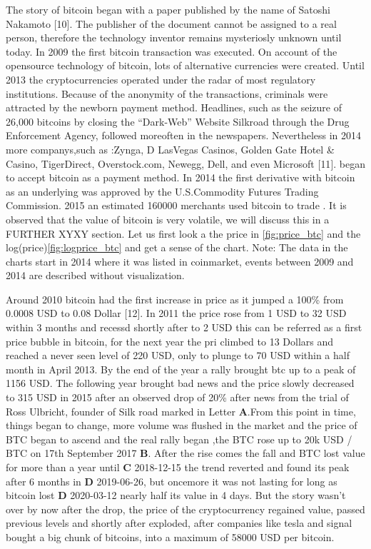 \documentclass[
]{article}
\begin{document}
The story of bitcoin began with a paper published by the name of Satoshi
Nakamoto {[}10{]}. The publisher of the document cannot be assigned to a
real person, therefore the technology inventor remains mysteriosly
unknown until today. In 2009 the first bitcoin transaction was executed.
On account of the opensource technology of bitcoin, lots of alternative
currencies were created. Until 2013 the cryptocurrencies operated under
the radar of most regulatory institutions. Because of the anonymity of
the transactions, criminals were attracted by the newborn payment
method. Headlines, such as the seizure of 26,000 bitcoins by closing the
``Dark-Web'' Website Silkroad through the Drug Enforcement Agency,
followed moreoften in the newspapers. Nevertheless in 2014 more
companys,such as :Zynga, D LasVegas Casinos, Golden Gate Hotel \&
Casino, TigerDirect, Overstock.com, Newegg, Dell, and even Microsoft
{[}11{]}. began to accept bitcoin as a payment method. In 2014 the first
derivative with bitcoin as an underlying was approved by the
U.S.Commodity Futures Trading Commission. 2015 an estimated 160000
merchants used bitcoin to trade . It is observed that the value of
bitcoin is very volatile, we will discuss this in a FURTHER XYXY
section. Let us first look a the price in \ref{fig:price_btc} and the
log(price)\ref{fig:logprice_btc} and get a sense of the chart. Note: The
data in the charts start in 2014 where it was listed in coinmarket,
events between 2009 and 2014 are described without visualization.

Around 2010 bitcoin had the first increase in price as it jumped a 100\%
from 0.0008 USD to 0.08 Dollar {[}12{]}. In 2011 the price rose from 1
USD to 32 USD within 3 months and recessd shortly after to 2 USD this
can be referred as a first price bubble in bitcoin, for the next year
the pri climbed to 13 Dollars and reached a never seen level of 220 USD,
only to plunge to 70 USD within a half month in April 2013. By the end
of the year a rally brought btc up to a peak of 1156 USD. The following
year brought bad news and the price slowly decreased to 315 USD in 2015
after an observed drop of 20\% after news from the trial of Ross
Ulbricht, founder of Silk road marked in Letter \textbf{A}.From this
point in time, things began to change, more volume was flushed in the
market and the price of BTC began to ascend and the real rally began
,the BTC rose up to 20k USD / BTC on 17th September 2017 \textbf{B}.
After the rise comes the fall and BTC lost value for more than a year
until \textbf{C} 2018-12-15 the trend reverted and found its peak after
6 months in \textbf{D} 2019-06-26, but oncemore it was not lasting for
long as bitcoin lost \textbf{D} 2020-03-12 nearly half its value in 4
days. But the story wasn't over by now after the drop, the price of the
cryptocurrency regained value, passed previous levels and shortly after
exploded, after companies like tesla and signal bought a big chunk of
bitcoins, into a maximum of 58000 USD per bitcoin.
\end{document}
